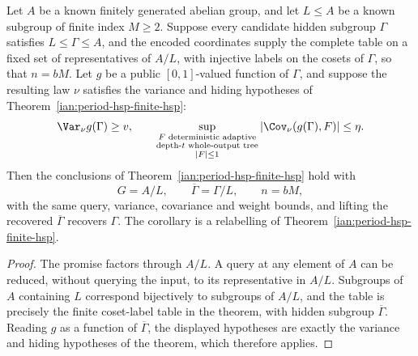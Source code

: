 \begin{corollary}\label{ian:period-hsp-finitely-generated}
Let \(A\) be a known finitely generated abelian group, and let \(L\le A\) be a known subgroup of finite index \(M\ge2\). Suppose every candidate hidden subgroup \(\Gamma\) satisfies \(L\le\Gamma\le A\), and the encoded coordinates supply the complete table on a fixed set of representatives of \(A/L\), with injective labels on the cosets of \(\Gamma\), so that \(n=bM\). Let \(g\) be a public \([0,1]\)-valued function of \(\Gamma\), and suppose the resulting law \(\nu\) satisfies the variance and hiding hypotheses of Theorem~\ref{ian:period-hsp-finite-hsp}:
\[
 \Var_\nu g(\Gamma)\ge v,
 \qquad
 \sup_{\substack{F\text{ deterministic adaptive}\\
                  \text{depth-}t\text{ whole-output tree}\\
                  |F|\le1}}
 |\Cov_\nu(g(\Gamma),F)|\le\eta.
\]
Then the conclusions of Theorem~\ref{ian:period-hsp-finite-hsp} hold with
\[
 G=A/L,\qquad \overline\Gamma=\Gamma/L,\qquad n=bM,
\]
with the same query, variance, covariance and weight bounds, and lifting the recovered \(\overline\Gamma\) recovers \(\Gamma\). The corollary is a relabelling of Theorem~\ref{ian:period-hsp-finite-hsp}.
\end{corollary}

\begin{proof}
The promise factors through \(A/L\). A query at any element of \(A\) can be reduced, without querying the input, to its representative in \(A/L\). Subgroups of \(A\) containing \(L\) correspond bijectively to subgroups of \(A/L\), and the table is precisely the finite coset-label table in the theorem, with hidden subgroup \(\overline\Gamma\). Reading \(g\) as a function of \(\overline\Gamma\), the displayed hypotheses are exactly the variance and hiding hypotheses of the theorem, which therefore applies.
\end{proof}

